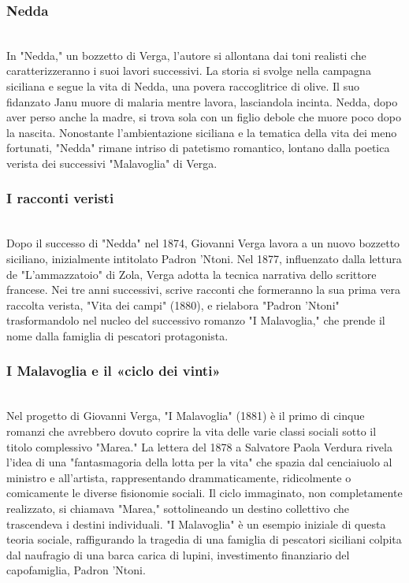 \documentclass{report}
\begin{document}
\subsubsection{Nedda}
\\
In "Nedda," un bozzetto di Verga, l'autore si allontana dai toni realisti che caratterizzeranno i suoi lavori successivi. La storia si svolge nella campagna siciliana e segue la vita di Nedda, una povera raccoglitrice di olive. Il suo fidanzato Janu muore di malaria mentre lavora, lasciandola incinta. Nedda, dopo aver perso anche la madre, si trova sola con un figlio debole che muore poco dopo la nascita. Nonostante l'ambientazione siciliana e la tematica della vita dei meno fortunati, "Nedda" rimane intriso di patetismo romantico, lontano dalla poetica verista dei successivi "Malavoglia" di Verga.
\\
\subsubsection{I racconti veristi}
\\
Dopo il successo di "Nedda" nel 1874, Giovanni Verga lavora a un nuovo bozzetto siciliano, inizialmente intitolato Padron 'Ntoni. Nel 1877, influenzato dalla lettura de "L'ammazzatoio" di Zola, Verga adotta la tecnica narrativa dello scrittore francese. Nei tre anni successivi, scrive racconti che formeranno la sua prima vera raccolta verista, "Vita dei campi" (1880), e rielabora "Padron 'Ntoni" trasformandolo nel nucleo del successivo romanzo "I Malavoglia," che prende il nome dalla famiglia di pescatori protagonista.
\\
\subsubsection{I Malavoglia e il «ciclo dei vinti»}
\\
Nel progetto di Giovanni Verga, "I Malavoglia" (1881) è il primo di cinque romanzi che avrebbero dovuto coprire la vita delle varie classi sociali sotto il titolo complessivo "Marea." La lettera del 1878 a Salvatore Paola Verdura rivela l'idea di una "fantasmagoria della lotta per la vita" che spazia dal cenciaiuolo al ministro e all'artista, rappresentando drammaticamente, ridicolmente o comicamente le diverse fisionomie sociali. Il ciclo immaginato, non completamente realizzato, si chiamava "Marea," sottolineando un destino collettivo che trascendeva i destini individuali. "I Malavoglia" è un esempio iniziale di questa teoria sociale, raffigurando la tragedia di una famiglia di pescatori siciliani colpita dal naufragio di una barca carica di lupini, investimento finanziario del capofamiglia, Padron 'Ntoni.
\\
\end{document}
